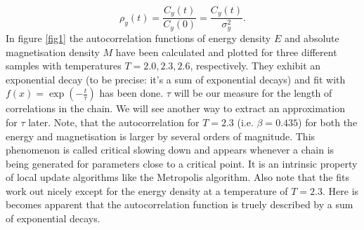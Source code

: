 \documentclass[11pt, a4paper]{scrartcl}
\begin{document}
    $$
    \rho_y(t) = \frac{C_y(t)}{C_y(0)} = \frac{C_y(t)}{\sigma_y^2} .
    $$
    In figure \ref{fig1} the autocorrelation functions of energy density $E$ and absolute magnetisation density $M$ have been calculated and plotted for three different samples with temperatures $T = 2.0, 2.3, 2.6$, respectively. They exhibit an exponential decay (to be precise: it's a sum of exponential decays) and fit with $f(x) = \exp(-\frac{t}{\tau})$ has been done. $\tau$ will be our measure for the length of correlations in the chain. We will see another way to extract an approximation for $\tau$ later. Note, that the autocorrelation for $T = 2.3$ (i.e. $\beta = 0.435$) for both the energy and magnetisation is larger by several orders of magnitude. This phenomenon is called critical slowing down and appears whenever a chain is being generated for parameters close to a critical point. It is an intrinsic property of local update algorithms like the Metropolis algorithm. Also note that the fits work out nicely except for the energy density at a temperature of $T = 2.3$. Here is becomes apparent that the autocorrelation function is truely described by a sum of exponential decays.
\end{document}
